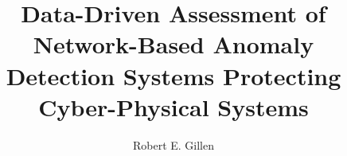 \documentclass[11pt, twoside]{report}
\title{Data-Driven Assessment of Network-Based Anomaly \\ Detection Systems Protecting \\ Cyber-Physical Systems} %
\author{Robert E. Gillen} %
\newcounter{appendix}
\begin{document}
                         
\beforepreface         %
\dedicationpage        %
\acknowledgmentspage   %
  
\afterpreface          %
%           
\ttutext               %
     
   
    
    
   

     
     
 
\appendixnodots
   
 
   

      
\end{document}
